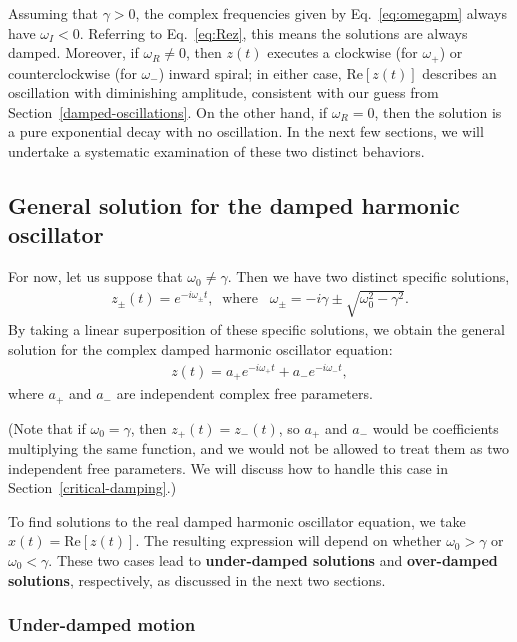 \documentclass[10pt,a4paper]{article}
\begin{document}
Assuming that $\gamma > 0$, the complex frequencies given by
Eq.~\eqref{eq:omegapm} always have $\omega_I < 0$.  Referring to
Eq.~\eqref{eq:Rez}, this means the solutions are always damped.
Moreover, if $\omega_R \ne 0$, then $z(t)$ executes a clockwise (for
$\omega_+$) or counterclockwise (for $\omega_-$) inward spiral; in
either case, $\mathrm{Re}[z(t)]$ describes an oscillation with
diminishing amplitude, consistent with our guess from
Section~\ref{damped-oscillations}.  On the other hand, if $\omega_R =
0$, then the solution is a pure exponential decay with no oscillation.
In the next few sections, we will undertake a systematic examination
of these two distinct behaviors.

\subsection{General solution for the damped harmonic oscillator}
\label{general-solution}

For now, let us suppose that $\omega_0 \ne \gamma$. Then we have two
distinct specific solutions,
\begin{align}
  z_\pm(t) = e^{-i\omega_\pm t}, \;\;\mathrm{where}\;\;\; \omega_\pm = -i\gamma \pm \sqrt{\omega_0^2 - \gamma^2}.
\end{align}
By taking a linear superposition of these specific solutions, we
obtain the general solution for the complex damped harmonic oscillator
equation:
\begin{align}
  z(t) = a_+ e^{-i\omega_+ t} + a_- e^{-i\omega_- t},
  \label{eq:gsol}
\end{align}
where $a_+$ and $a_-$ are independent complex free parameters.

(Note that if $\omega_0 = \gamma$, then $z_+(t) = z_-(t)$, so $a_+$
and $a_-$ would be coefficients multiplying the same function, and we
would not be allowed to treat them as two independent free
parameters. We will discuss how to handle this case in
Section~\ref{critical-damping}.)

To find solutions to the real damped harmonic oscillator equation, we
take $x(t) = \mathrm{Re}[z(t)]$. The resulting expression will depend
on whether $\omega_0 > \gamma$ or $\omega_0 < \gamma$. These two cases
lead to \textbf{under-damped solutions} and \textbf{over-damped
  solutions}, respectively, as discussed in the next two sections.

\subsubsection{Under-damped motion}
\label{underdamped}
\end{document}
